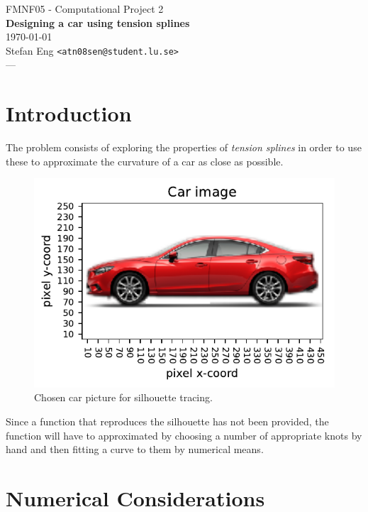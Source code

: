 \documentclass{article}
\begin{document}
\begin{center}
  {\small FMNF05 - Computational Project 2} \\
  {\Large\textbf{Designing a car using tension splines}} \\
  \today\\
  Stefan Eng \texttt{<atn08sen@student.lu.se>} \\
  \vspace{0.2cm}
  {\Large ---}
  \vspace{-0.8cm}
\end{center}

\section*{Introduction}

  The problem consists of exploring the properties of \textit{tension splines}
  in order to use these to approximate the curvature of a car as close as possible.

  \begin{figure}[!ht]
    \center
    \includegraphics{figs/p2-car.pdf}
    \caption{Chosen car picture for silhouette tracing.}
  \end{figure}

  Since a function that reproduces the silhouette has not been provided, the
  function will have to approximated by choosing a number of appropriate knots
  by hand and then fitting a curve to them by numerical means.

\section*{Numerical Considerations}
\end{document}
